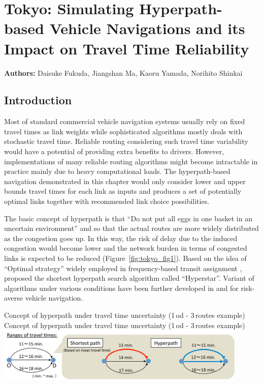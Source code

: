 \chapter{Tokyo: Simulating Hyperpath-based Vehicle Navigations and its Impact on Travel Time Reliability}
\label{ch:tokyo}
\hfill \textbf{Authors:} Daisuke Fukuda, Jiangshan Ma, Kaoru Yamada, Norihito Shinkai

\section{Introduction}

Most of standard commercial vehicle navigation systems usually rely on fixed travel times as link weights while sophisticated algorithms mostly deals with stochastic travel time. Reliable routing considering such travel time variability would have a potential of providing extra benefits to drivers. However, implementations of many reliable routing algorithms might become intractable in practice mainly due to heavy computational loads. The hyperpath-based navigation demonstrated in this chapter would only consider lower and upper bounds travel times for each link as inputs and produces a set of potentially optimal links together with recommended link choice possibilities.  

The basic concept of hyperpath is that ``Do not put all eggs in one basket in an uncertain environment'' and so that the actual routes are more widely distributed as the congestion goes up. In this way, the risk of delay due to the induced congestion would become lower and the network burden in terms of congested links is expected to be reduced (Figure~\ref{fig:tokyo_fig1}). Based on the idea of ``Optimal strategy'' widely employed in frequency-based transit assignment \citep[see][]{Spiess1989}, \citet{Bell2009} proposed the shortest hyperpath search algorithm called ``Hyperstar''. Variant of algorithms under various conditions have been further developed in \citet{Bell2012} and \citet{Ma2013} for risk-averse vehicle navigation.

\createfigure%
{Concept of hyperpath under travel time uncertainty (1\,\gls{od} - 3\,routes example)}%
{Concept of hyperpath under travel time uncertainty (1\,\gls{od} - 3\,routes example)}%
{\label{fig:tokyo_fig1}}%
{\includegraphics[width=0.90\textwidth, angle=0]{./scenarios/figures/tokyo_fig1.pdf}}%
{}

